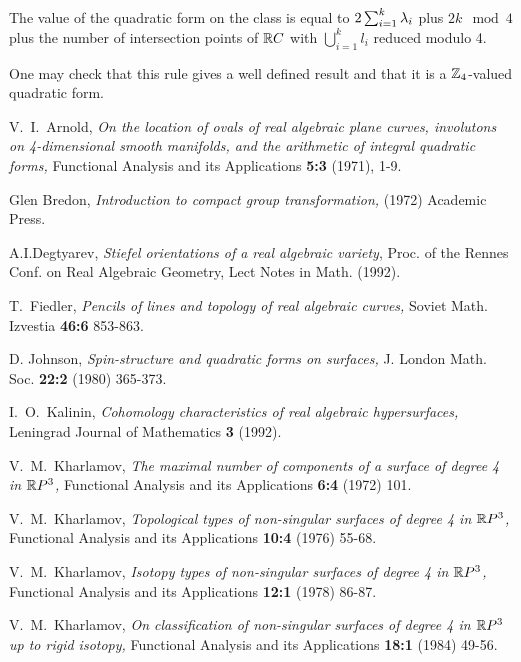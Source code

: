 \documentclass{article}
\numberwithin{equation}{section}
\begin{document}
The value of the quadratic form on the class is equal to
$2\sum^{k}_{i=1}\lambda_i$ plus $2k \mod4$ plus the number of intersection
points of $\mathbb R C$ with $\bigcup_{i=1}^{k}l_i$ reduced modulo 4.

One may check that this rule gives a well defined result and that it is
a $\mathbb Z_4$-valued quadratic form.

\begin{thebibliography}{999} 
V.~I.~Arnold,
{\it On the location of ovals of real algebraic plane curves,
involutons on 4-dimensional smooth manifolds, and the arithmetic of
integral quadratic forms,\/} Functional Analysis and its Applications
{\bf 5:3} (1971), 1-9.

 Glen Bredon, {\it Introduction to compact group
transformation,\/} (1972) Academic Press.

 A.I.Degtyarev,
{\it Stiefel orientations of a real algebraic variety\/}, 
Proc. of the Rennes Conf. on Real Algebraic Geometry, Lect
Notes in Math.
(1992).

 T.~Fiedler,
{\it Pencils of lines and topology of real algebraic
curves,\/}
Soviet Math. Izvestia
{\bf46:6}
853-863.

D. Johnson,
{\it   Spin-structure and quadratic forms on surfaces,\/}
 J. London Math. Soc.
{\bf 22:2}
(1980) 365-373.

I.~O.~Kalinin,
{\it  Cohomology characteristics of real algebraic hypersurfaces,\/}
 Leningrad Journal of Mathematics
{\bf 3}
(1992).

V.~M.~Kharlamov,
{\it  The maximal number of components of a surface  of degree 4 in
$\mathbb R P^3$,\/}
Functional Analysis and its Applications
{\bf 6:4}
(1972) 101.

V.~M.~Kharlamov,
{\it  Topological types of non-singular surfaces of degree 4 in $\mathbb R P^3$,\/}
Functional Analysis and its Applications
{\bf10:4}
(1976) 55-68.

V.~M.~Kharlamov,
{\it  Isotopy types of non-singular surfaces of degree 4 in $\mathbb R P^3$,\/}
Functional Analysis and its Applications
{\bf 12:1}
(1978) 86-87.

V.~M.~Kharlamov,
{\it  On classification of non-singular surfaces of degree 4 in
$\mathbb R P^3$ up to rigid isotopy,\/}
Functional Analysis and its Applications
{\bf 18:1} (1984) 49-56.


\end{thebibliography}
\end{document}
